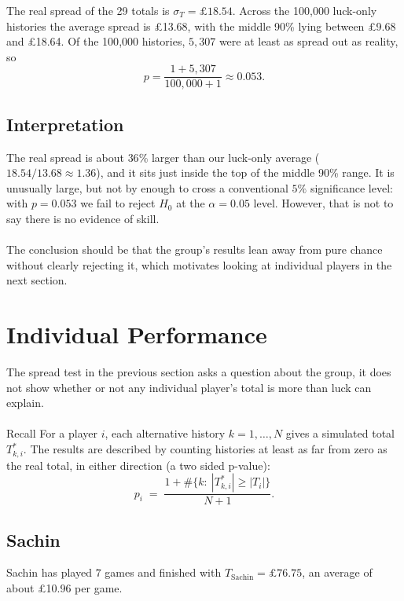 \documentclass[11pt,a4paper]{article}
\begin{document}
The real spread of the 29 totals is $\sigma_T=\pounds18.54$. Across the
100{,}000 luck-only histories the average spread is \pounds13.68, with the
middle 90\% lying between \pounds9.68 and \pounds18.64. Of the 100{,}000
histories, $5{,}307$ were at least as spread out as reality, so
\begin{equation}
  p = \frac{1+5{,}307}{100{,}000+1} \approx 0.053.
\end{equation}

\subsection{Interpretation}

The real spread is about $36\%$ larger than our luck-only average ($18.54/13.68\approx1.36$), and it sits just inside the top of the middle 90\% range. It is unusually large, but not by enough to cross a conventional $5\%$ significance level: with $p=0.053$ we fail to reject $H_0$ at the
$\alpha=0.05$ level. However, that is not to say there is no evidence of skill.\\\\
The conclusion should be that the group's results lean away from pure chance without clearly rejecting it, which motivates looking at individual players in the next section.

\newpage

\section{Individual Performance}

The spread test in the previous section asks a question about the group, it does not show whether or not any individual player's total is more than luck can explain. \\\\
Recall For a player $i$, each alternative history $k=1,\dots,N$ gives a simulated total $T^{*}_{k,i}$. The results are described by counting histories at least as far
from zero as the real total, in either direction (a two sided p-value):
\begin{equation}
  p_i \;=\; \frac{1+\#\{k:\ |T^{*}_{k,i}|\ge |T_i|\}}{N+1}.
\end{equation}

\subsection{Sachin}

Sachin has played $7$ games and finished with $T_{\text{Sachin}}=\pounds76.75$, an average of
about \pounds10.96 per game.
\end{document}
